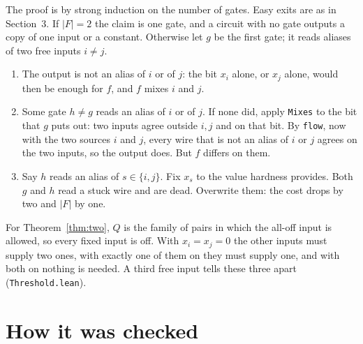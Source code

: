 \documentclass[11pt]{amsart}
\theoremstyle{definition}
\theoremstyle{remark}
\newcommand{\lean}[1]{\texttt{#1}}
\begin{document}
The proof is by strong induction on the number of gates. Easy exits are as in Section~3. If
$|F|=2$ the claim is one gate, and a circuit with no gate outputs a copy of one input or a
constant. Otherwise let $g$ be the first gate; it reads aliases of two free inputs $i\ne j$.
\begin{enumerate}
\item The output is not an alias of $i$ or of $j$: the bit $x_i$ alone, or $x_j$ alone, would
  then be enough for $f$, and $f$ mixes $i$ and $j$.
\item Some gate $h\ne g$ reads an alias of $i$ or of $j$. If none did, apply \lean{Mixes} to
  the bit that $g$ puts out: two inputs agree outside $i,j$ and on that bit. By \lean{flow},
  now with the two sources $i$ and $j$, every wire that is not an alias of $i$ or $j$ agrees on
  the two inputs, so the output does. But $f$ differs on them.
\item Say $h$ reads an alias of $s\in\{i,j\}$. Fix $x_s$ to the value hardness provides. Both
  $g$ and $h$ read a stuck wire and are dead. Overwrite them: the cost drops by two and
  $|F|$ by one.
\end{enumerate}

For Theorem~\ref{thm:two}, $Q$ is the family of pairs in which the all-off input is allowed,
so every fixed input is off. With $x_i=x_j=0$ the other inputs must supply two ones, with
exactly one of them on they must supply one, and with both on nothing is needed. A third free
input tells these three apart (\lean{Threshold.lean}).

\section{How it was checked}
\end{document}
